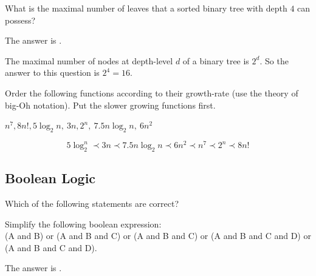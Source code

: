 \begin{question}
What is the maximal number of leaves that a sorted binary tree with depth $4$ can possess?
\begin{solution}
The answer is .
\end{solution}
The maximal number of nodes at depth-level $d$ of a binary tree is $2^d$. So the answer to this question is $2^4 = 16$. 
\end{question}

\begin{question}
Order the following functions according to their growth-rate (use the theory of big-Oh notation). Put the slower growing functions first.

$ n^7, 8n!, 5 \log_2 n,~ 3n, 2^n, ~ 7.5 n\log_2 n, ~ 6 n^2$ 

\begin{solution}
\end{solution}
\begin{equation*}
5 \log_2^n \prec 3n \prec 7.5 n \log_2{n} \prec 6n^2 \prec n^7 \prec 2^n \prec 8n!
\end{equation*}
\end{question}

\subsection*{Boolean Logic}

\begin{question}
Which of the following statements are correct?
\begin{solution}
\begin{multiple-choice}
\end{multiple-choice}
\end{solution}
\end{question}

\begin{question}
Simplify the following boolean expression: \\
(A and B) or (A and B and C) or (A and B and C) or (A and B and C and D) or (A and B and C and D).
\begin{solution}
The answer is . 
\end{solution}
\end{question}

